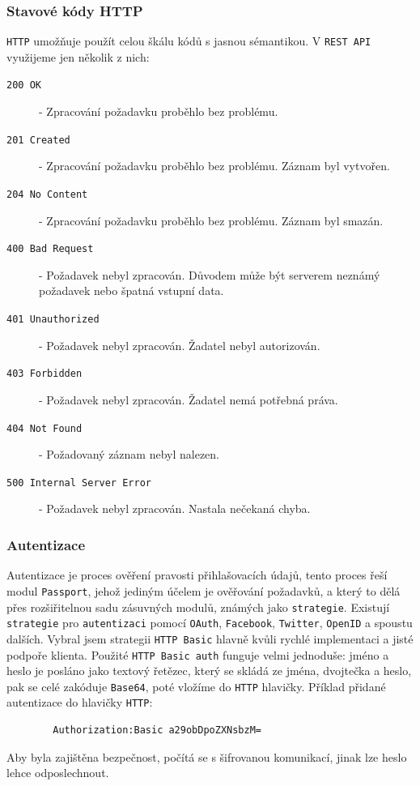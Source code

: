 \documentclass[czech,BP]{thesiskiv}
\begin{document}
			\subsubsection{Stavové kódy HTTP}
			\texttt{HTTP} umožňuje použít celou škálu kódů s jasnou sémantikou. V \texttt{REST API} využijeme jen několik z nich:
\begin{description}
\item [\texttt{200 OK}] - Zpracování požadavku proběhlo bez problému.
\item [\texttt{201 Created}] - Zpracování požadavku proběhlo bez problému. Záznam byl vytvořen. 
\item [\texttt{204 No Content}] - Zpracování požadavku proběhlo bez problému. Záznam byl smazán.
\item [\texttt{400 Bad Request}] - Požadavek nebyl zpracován. Důvodem může být serverem neznámý požadavek nebo špatná vstupní data.
\item [\texttt{401 Unauthorized}] - Požadavek nebyl zpracován. Žadatel nebyl autorizován.
\item [\texttt{403 Forbidden}] - Požadavek nebyl zpracován. Žadatel nemá potřebná práva.
\item [\texttt{404 Not Found}] - Požadovaný záznam nebyl nalezen.
\item [\texttt{500 Internal Server Error}] - Požadavek nebyl zpracován. Nastala nečekaná chyba.
\end{description}

	\subsubsection{Autentizace}
		Autentizace je proces ověření pravosti přihlašovacích údajů, tento proces řeší modul \texttt{Passport}, jehož jediným účelem je ověřování požadavků, a který to dělá přes rozšiřitelnou sadu zásuvných modulů, známých jako \texttt{strategie}. 
		Existují \texttt{strategie} pro \texttt{autentizaci} pomocí \texttt{OAuth}, \texttt{Facebook}, \texttt{Twitter}, \texttt{OpenID} a spoustu dalších.		
		Vybral jsem strategii \texttt{HTTP Basic} hlavně kvůli rychlé implementaci a jisté podpoře klienta.
		Použité \texttt{HTTP Basic auth} funguje velmi jednoduše: jméno a heslo je posláno jako textový řetězec, který se skládá ze jména, dvojtečka a heslo, pak se celé zakóduje \texttt{Base64}, poté vložíme do \texttt{HTTP} hlavičky.
Příklad přidané autentizace do hlavičky \texttt{HTTP}:
\begin{verbatim}
		Authorization:Basic a29obDpoZXNsbzM=
\end{verbatim}
Aby byla zajištěna bezpečnost, počítá se s šifrovanou komunikací, jinak lze heslo lehce odposlechnout.
\end{document}
